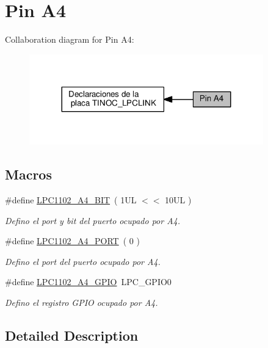 \hypertarget{group___p_i_n_a4}{}\section{Pin A4}
\label{group___p_i_n_a4}
Collaboration diagram for Pin A4\+:\nopagebreak
\begin{figure}[H]
\begin{center}
\leavevmode
\includegraphics[width=287pt]{group___p_i_n_a4}
\end{center}
\end{figure}
\subsection*{Macros}
\begin{DoxyCompactItemize}
\item 
\#define \hyperlink{group___p_i_n_a4_ga23798f2c62b59f2710bbea33952bfcc8}{L\+P\+C1102\+\_\+\+A4\+\_\+\+B\+IT}~( 1\+U\+L $<$$<$ 10\+U\+L )
\begin{DoxyCompactList}\small\item\em Defino el port y bit del puerto ocupado por A4. \end{DoxyCompactList}\item 
\#define \hyperlink{group___p_i_n_a4_ga03e8289e4ef7c73d23799d95329c4d81}{L\+P\+C1102\+\_\+\+A4\+\_\+\+P\+O\+RT}~( 0 )
\begin{DoxyCompactList}\small\item\em Defino el port del puerto ocupado por A4. \end{DoxyCompactList}\item 
\#define \hyperlink{group___p_i_n_a4_ga958d137c3a737689f2158ceae5f0c7b1}{L\+P\+C1102\+\_\+\+A4\+\_\+\+G\+P\+IO}~L\+P\+C\+\_\+\+G\+P\+I\+O0
\begin{DoxyCompactList}\small\item\em Defino el registro G\+P\+IO ocupado por A4. \end{DoxyCompactList}\end{DoxyCompactItemize}


\subsection{Detailed Description}


